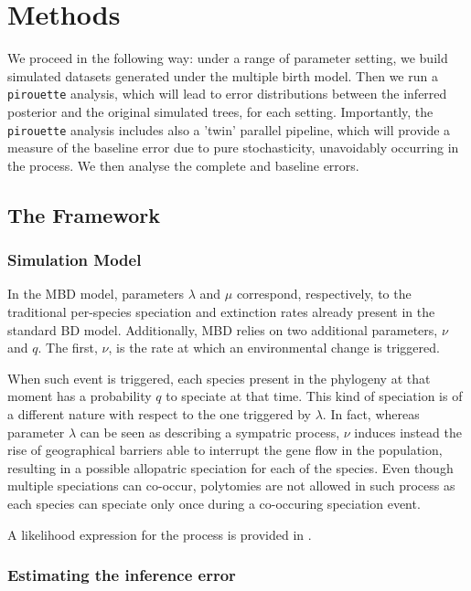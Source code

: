 \section{Methods}

We proceed in the following way: under a range of parameter setting, we build simulated datasets generated under the multiple birth model. 
Then we run a \verb;pirouette; analysis, which will lead to error distributions between the inferred posterior and the original simulated trees, for each setting. 
Importantly, the \verb;pirouette; analysis includes also a 'twin' parallel pipeline, which will provide a measure of the baseline error due to pure stochasticity, unavoidably occurring in the process.
We then analyse the complete and baseline errors.
\subsection{The Framework}

\subsubsection{Simulation Model}

In the MBD model, parameters $\lambda$ and $\mu$ correspond, respectively, 
to the traditional per-species speciation and extinction rates 
already present in the standard BD model. 
Additionally, MBD relies on two additional parameters, $\nu$ and $q$. 
The first, $\nu$, is the rate at which an environmental change is triggered.

When such event is triggered, each species present in the phylogeny 
at that moment has a probability $q$ to speciate at that time.
This kind of speciation is of a different nature with respect to 
the one triggered by $\lambda$. 
In fact, whereas parameter $\lambda$ can be seen as 
describing a sympatric process, $\nu$ induces instead the rise of 
geographical barriers able to interrupt the gene flow in the population,
resulting in a possible allopatric speciation for each of the species.  
Even though multiple speciations can co-occur, 
polytomies are not allowed in such process as each species can speciate only 
once during a co-occuring speciation event.

A likelihood expression for the process is provided in \cite{mbd}.

\subsubsection{Estimating the inference error}

